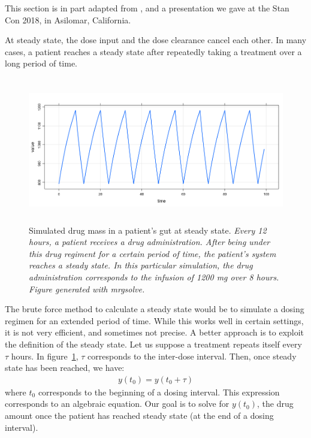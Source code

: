\documentclass[11pt]{article}
\begin{document}
This section is in part adapted from \cite{Margossian:2018}, and a 
presentation we gave at the Stan Con 2018, in Asilomar, California.

At steady state, the dose input and the dose clearance cancel each other.
In many cases, a patient reaches a steady state after repeatedly taking a treatment
over a long period of time.

\begin{figure}[!htb]
\begin{center}
\includegraphics[width = 5in, height = 2.5in, trim=0in 0in 0 0in]{graphics/SS.png}
\caption{Simulated drug mass in a patient's gut at steady state. \textit{Every 12 hours, a patient
receives a drug administration. After being under this drug regiment for a certain period of time, 
the patient's system reaches a steady state. In this particular simulation, the drug administration
corresponds to the infusion of 1200 mg over 8 hours. Figure generated with mrgsolve.}}
\label{fig:steadyState}
\end{center}
\end{figure}

The brute force method to calculate a steady state would be to simulate a dosing regimen
for an extended period of time. While this works well in certain settings, it is not very efficient,
and sometimes not precise. A better approach is to exploit the definition of the steady state.
Let us suppose a treatment repeats itself every $\tau$ hours. In figure~\ref{fig:steadyState},
$\tau$ corresponds to the inter-dose interval. Then, once steady state has been reached,
we have:
%
\begin{eqnarray}
y(t_0) = y(t_0 + \tau)
\end{eqnarray}
%
where $t_0$ corresponds to the beginning of a dosing interval. This expression corresponds 
to an algebraic equation. Our goal is to solve for $y(t_0)$, the drug amount once the
patient has reached steady state (at the end of a dosing interval).
\end{document}
